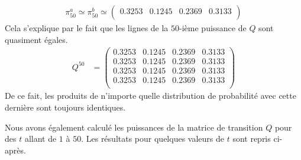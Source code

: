 \documentclass[a4paper, 12pt]{report}
\begin{document}
    \begin{align*}
        \pi_{50}^a \simeq \pi_{50}^b \simeq
        \begin{pmatrix}
            \num{0.3253} & \num{0.1245} & \num{0.2369} & \num{0.3133} \\
        \end{pmatrix}
    \end{align*}
    Cela s'explique par le fait que les lignes de la $\num{50}$-ième puissance de $Q$ sont quasiment égales.
    \begin{align*}
        Q^{50} & =
        \begin{pmatrix}
	        \num{0.3253} & \num{0.1245} & \num{0.2369} & \num{0.3133} \\
	        \num{0.3253} & \num{0.1245} & \num{0.2369} & \num{0.3133} \\
	        \num{0.3253} & \num{0.1245} & \num{0.2369} & \num{0.3133} \\
	        \num{0.3253} & \num{0.1245} & \num{0.2369} & \num{0.3133} \\
	    \end{pmatrix}
    \end{align*}
    De ce fait, les produits de n'importe quelle distribution de probabilité avec cette dernière sont toujours identiques.\par
    Nous avons également calculé les puissances de la matrice de transition $Q$ pour des $t$ allant de $1$ à $50$. Les résultats pour quelques valeurs de $t$ sont repris ci-après.\par
\end{document}
